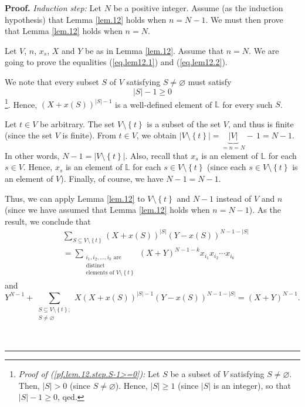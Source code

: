 \documentclass[numbers=enddot,12pt,final,onecolumn,notitlepage]{scrartcl}%
\theoremstyle{definition}
\newenvironment{proof}[1][Proof]{\noindent\textbf{#1.} }{\ \rule{0.5em}{0.5em}}
\let\sumnonlimits\sum
\renewcommand{\sum}{\sumnonlimits\limits}
\newenvironment{verlong}{}{}
\begin{document}
\begin{verlong}
\begin{proof}
\textit{Induction step:} Let $N$ be a positive integer. Assume (as the
induction hypothesis) that Lemma \ref{lem.12} holds when $n=N-1$. We must then
prove that Lemma \ref{lem.12} holds when $n=N$.

Let $V$, $n$, $x_{s}$, $X$ and $Y$ be as in Lemma \ref{lem.12}. Assume that
$n=N$. We are going to prove the equalities (\ref{eq.lem12.1}) and
(\ref{eq.lem12.2}).

We note that every subset $S$ of $V$ satisfying $S\neq\varnothing$ must
satisfy
\begin{equation}
\left\vert S\right\vert -1\geq0 \label{pf.lem.12.step.S-1>=0}%
\end{equation}
\footnote{\textit{Proof of (\ref{pf.lem.12.step.S-1>=0}):} Let $S$ be a subset
of $V$ satisfying $S\neq\varnothing$. Then, $\left\vert S\right\vert >0$
(since $S\neq\varnothing$). Hence, $\left\vert S\right\vert \geq1$ (since
$\left\vert S\right\vert $ is an integer), so that $\left\vert S\right\vert
-1\geq0$, qed.}. Hence, $\left(  X+x\left(  S\right)  \right)  ^{\left\vert
S\right\vert -1}$ is a well-defined element of $\mathbb{L}$ for every such $S$.

Let $t\in V$ be arbitrary. The set $V\setminus\left\{  t\right\}  $ is a
subset of the set $V$, and thus is finite (since the set $V$ is finite). From
$t\in V$, we obtain $\left\vert V\setminus\left\{  t\right\}  \right\vert
=\underbrace{\left\vert V\right\vert }_{=n=N}-\,1=N-1$. In other words,
$N-1=\left\vert V\setminus\left\{  t\right\}  \right\vert $. Also, recall that
$x_{s}$ is an element of $\mathbb{L}$ for each $s\in V$. Hence, $x_{s}$ is an
element of $\mathbb{L}$ for each $s\in V\setminus\left\{  t\right\}  $ (since
each $s\in V\setminus\left\{  t\right\}  $ is an element of $V$). Finally, of
course, we have $N-1=N-1$.

Thus, we can apply Lemma \ref{lem.12} to $V\setminus\left\{  t\right\}  $ and
$N-1$ instead of $V$ and $n$ (since we have assumed that Lemma \ref{lem.12}
holds when $n=N-1$). As the result, we conclude that%
\begin{align}
&  \sum_{S\subseteq V\setminus\left\{  t\right\}  }\left(  X+x\left(
S\right)  \right)  ^{\left\vert S\right\vert }\left(  Y-x\left(  S\right)
\right)  ^{N-1-\left\vert S\right\vert }\nonumber\\
&  =\sum_{\substack{i_{1},i_{2},\ldots,i_{k}\text{ are}\\\text{distinct}%
\\\text{elements of }V\setminus\left\{  t\right\}  }}\left(  X+Y\right)
^{N-1-k}x_{i_{1}}x_{i_{2}}\cdots x_{i_{k}} \label{pf.lem.12.step.ih1}%
\end{align}
and%
\begin{equation}
Y^{N-1}+\sum_{\substack{S\subseteq V\setminus\left\{  t\right\}
;\\S\neq\varnothing}}X\left(  X+x\left(  S\right)  \right)  ^{\left\vert
S\right\vert -1}\left(  Y-x\left(  S\right)  \right)  ^{N-1-\left\vert
S\right\vert }=\left(  X+Y\right)  ^{N-1}. \label{pf.lem.12.step.ih2}%
\end{equation}



\end{proof}
\end{verlong}
\end{document}
